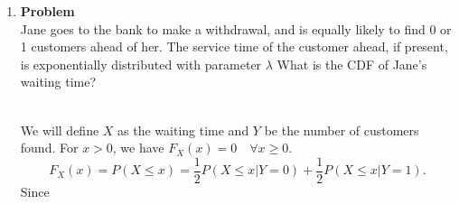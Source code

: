 \documentclass[12pt]{article}
\newenvironment{Ex}{\textbf{Problem}\vspace{.75em}\\}{}
\begin{document}
\begin{enumerate}
\begin{Ex}
\begin{solution}
\begin{enumerate}
\begin{equation}
\begin{aligned}
          \end{aligned}
        \end{equation}
        Which makes $F_X(z)$
        \begin{equation}
          \label{eq:fx-sol}
          \implies F_X(x) = \left\{
            \begin{aligned}
              & \frac{1}{2} &&\quad 0\le x < 1 \\
              & \frac{3}{4} &&\quad 1\le x < 3 \\
              & 1 &&\quad x\ge 3 \\
              & 0 &&\quad\text{otherwise} \\
            \end{aligned} \right.
        \end{equation}
        And $F_Y(z)$
        \begin{equation}
          \label{eq:fy-sol}
          \implies F_Y(y) = \left\{
            \begin{aligned}
              & \frac{y}{2} &&\quad 0\le y < 2 \\
              & 1 &&\quad y\ge 2 \\
              & 0 &&\quad\text{otherwise} \\
            \end{aligned} \right.
        \end{equation}
      \end{enumerate}
    \end{solution}
  \end{Ex}
\item
  \begin{Ex}
    Jane goes to the bank to make a withdrawal, and is equally likely
    to find 0 or 1 customers ahead of her. The service time of the
    customer ahead, if present, is exponentially distributed with
    parameter $\lambda$ What is the CDF of Jane's waiting time?
    \begin{solution} \hfill \vspace{.75em} \\
      We will define $X$ as the waiting time and $Y$ be the number of
      customers found. For $x>0$, we have $F_{X}(x)=0 \quad\forall
      x\ge0$.
      \begin{equation}
        \label{eq:7-cdf}
        F_{X}(x) = P(X\le x) = \frac{1}{2}P(X\le x | Y=0) +
        \frac{1}{2}P(X\le x | Y=1).
      \end{equation}
      Since
      \begin{equation}

\end{equation}
\end{solution}
\end{Ex}
\end{enumerate}
\end{document}

